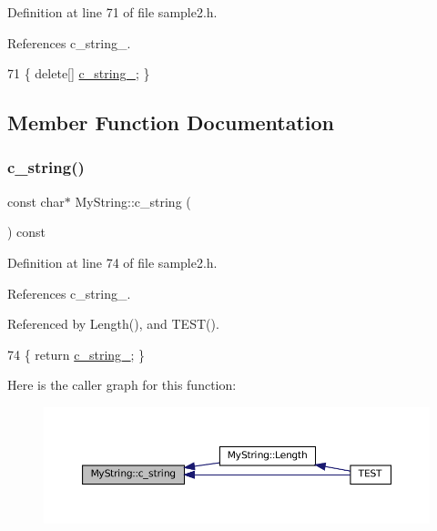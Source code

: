 Definition at line 71 of file sample2.\+h.



References c\+\_\+string\+\_\+.


\begin{DoxyCode}
71 \{ \textcolor{keyword}{delete}[] \hyperlink{classMyString_a1872c0d04ff5f6e654161472b18bb9d0}{c\_string\_}; \}
\end{DoxyCode}


\subsection{Member Function Documentation}
\mbox{\label{classMyString_aff2af0cf30db39fe24a235670ee6ff25}} 
\subsubsection{\texorpdfstring{c\+\_\+string()}{c\_string()}}
{\footnotesize\ttfamily const char$\ast$ My\+String\+::c\+\_\+string (\begin{DoxyParamCaption}{ }\end{DoxyParamCaption}) const\hspace{0.3cm}{\ttfamily [inline]}}



Definition at line 74 of file sample2.\+h.



References c\+\_\+string\+\_\+.



Referenced by Length(), and T\+E\+S\+T().


\begin{DoxyCode}
74 \{ \textcolor{keywordflow}{return} \hyperlink{classMyString_a1872c0d04ff5f6e654161472b18bb9d0}{c\_string\_}; \}
\end{DoxyCode}
Here is the caller graph for this function\+:
\nopagebreak
\begin{figure}[H]
\begin{center}
\leavevmode
\includegraphics[width=350pt]{classMyString_aff2af0cf30db39fe24a235670ee6ff25_icgraph}
\end{center}
\end{figure}
\mbox{\label{classMyString_a40753dcfa3314a8993f32bdd75d67ce2}} 
